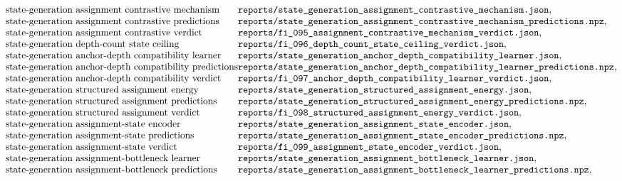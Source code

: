 $$\begin{array}{@{}l@{}l@{}}
\text{state-generation assignment contrastive mechanism} & \texttt{reports/state\_generation\_assignment\_contrastive\_mechanism.json},\\
\text{state-generation assignment contrastive predictions} & \texttt{reports/state\_generation\_assignment\_contrastive\_mechanism\_predictions.npz},\\
\text{state-generation assignment contrastive verdict} & \texttt{reports/fi\_095\_assignment\_contrastive\_mechanism\_verdict.json},\\
\text{state-generation depth-count state ceiling} & \texttt{reports/fi\_096\_depth\_count\_state\_ceiling\_verdict.json},\\
\text{state-generation anchor-depth compatibility learner} & \texttt{reports/state\_generation\_anchor\_depth\_compatibility\_learner.json},\\
\text{state-generation anchor-depth compatibility predictions} & \texttt{reports/state\_generation\_anchor\_depth\_compatibility\_learner\_predictions.npz},\\
\text{state-generation anchor-depth compatibility verdict} & \texttt{reports/fi\_097\_anchor\_depth\_compatibility\_learner\_verdict.json},\\
\text{state-generation structured assignment energy} & \texttt{reports/state\_generation\_structured\_assignment\_energy.json},\\
\text{state-generation structured assignment predictions} & \texttt{reports/state\_generation\_structured\_assignment\_energy\_predictions.npz},\\
\text{state-generation structured assignment verdict} & \texttt{reports/fi\_098\_structured\_assignment\_energy\_verdict.json},\\
\text{state-generation assignment-state encoder} & \texttt{reports/state\_generation\_assignment\_state\_encoder.json},\\
\text{state-generation assignment-state predictions} & \texttt{reports/state\_generation\_assignment\_state\_encoder\_predictions.npz},\\
\text{state-generation assignment-state verdict} & \texttt{reports/fi\_099\_assignment\_state\_encoder\_verdict.json},\\
\text{state-generation assignment-bottleneck learner} & \texttt{reports/state\_generation\_assignment\_bottleneck\_learner.json},\\
\text{state-generation assignment-bottleneck predictions} & \texttt{reports/state\_generation\_assignment\_bottleneck\_learner\_predictions.npz},\\

\end{array}$$
